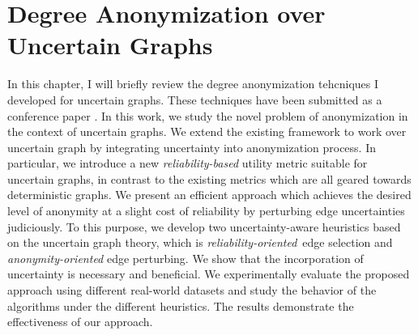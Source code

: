 \chapter{Degree Anonymization over Uncertain Graphs}
\label{chp:d}
In this chapter, I will briefly review the degree anonymization tehcniques I developed for uncertain graphs. These techniques have been submitted as a conference paper \cite{DegreeAUG}.
In this work, we study the novel problem of anonymization in the context of uncertain graphs. We extend the existing framework to work over uncertain graph by integrating uncertainty into anonymization process. In particular, we introduce a new {\em reliability-based} utility metric suitable for uncertain graphs, in contrast to the existing metrics which are all geared towards deterministic graphs. We present an efficient approach which achieves the desired level of anonymity at a slight cost of reliability by perturbing edge uncertainties judiciously.  To this purpose, we develop two uncertainty-aware heuristics based on the uncertain graph theory, which is {\em reliability-oriented}~edge selection and {\em anonymity-oriented} edge perturbing.  We show that the incorporation of uncertainty is necessary and beneficial. We experimentally evaluate the proposed approach using different real-world datasets and study the behavior of the algorithms under the different heuristics.  The results demonstrate the effectiveness of our approach. 



